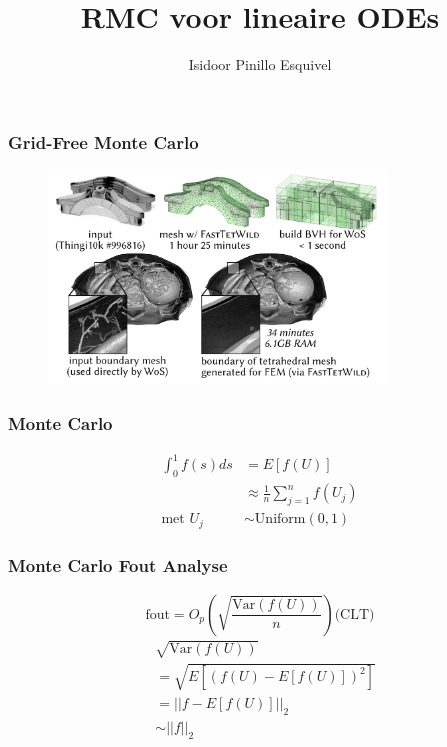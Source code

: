 \documentclass[20pt]{beamer}
\title{RMC voor lineaire ODEs}
\author{Isidoor Pinillo Esquivel }
\date{}
\begin{document}
\begin{frame}
    \titlepage
\end{frame}
\begin{frame}
    \frametitle{Grid-Free Monte Carlo}
    \cite{sawhney_grid-free_2022}
    \begin{figure}[h!]
        \centering
        \includegraphics[width=0.8\textwidth]{imgs/Grid_free_comparison.jpg}
        \label{fig:grid_free_comparison}
    \end{figure}
\end{frame}

\begin{frame}
    \frametitle{Monte Carlo}
    \vspace{-1cm}
    \begin{align}
        \int_{0}^{1} f(s) ds & = E[f(U)]                                   \\
                             & \approx \frac{1}{n} \sum_{j=1}^{n} f(U_{j}) \\
        \text{met } U_{j}    & \sim \text{Uniform}(0,1)
    \end{align}
\end{frame}

\begin{frame}
    \frametitle{Monte Carlo Fout Analyse}
    \vspace{-1cm}
    \begin{equation}
        \text{fout} = O_{p} \left(\sqrt{\frac{\text{Var}(f(U))}{n}} \right) \text{(CLT)}
    \end{equation}
    \pause
    \vspace{-1cm}
    \begin{align}
         & \sqrt{\text{Var}  (f(U))}      \\
         & = \sqrt{E[(f(U)-E[f(U)])^{2}]} \\
         & = ||f-E[f(U)]||_{2}            \\
         & \sim ||f||_{2}
    \end{align}
\end{frame}
\end{document}
